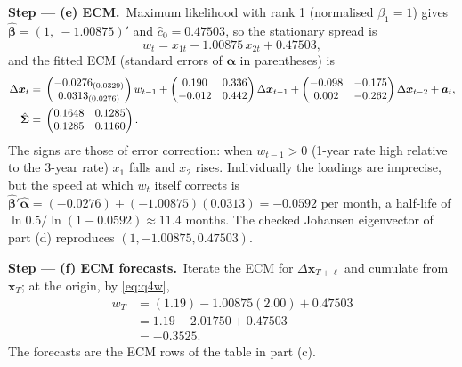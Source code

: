 \documentclass[11pt,a4paper]{article}
\newcommand{\passo}[2]{\par\smallskip\noindent\textbf{Step --- #1.}~#2}
\newcommand{\bx}{\bm{x}}\newcommand{\ba}{\bm{a}}\newcommand{\bb}{\bm{b}}\newcommand{\br}{\bm{r}}
\begin{document}
\begin{sol}
\passo{(e) ECM}{Maximum likelihood with rank 1 (normalised $\beta_1=1$) gives
$\hat{\bm\beta}=(1,\ -1.00875)'$ and $\hat c_0=0.47503$, so the stationary spread is
\begin{equation}
w_t=x_{1t}-1.00875\,x_{2t}+0.47503,\label{eq:q4w}
\end{equation}
and the fitted ECM (standard errors of $\bm\alpha$ in parentheses) is
\begin{align}
\Delta\bx_t={}&\begin{pmatrix}-0.0276_{(0.0329)}\\0.0313_{(0.0276)}\end{pmatrix}w_{t-1}
+\begin{pmatrix}0.190&0.336\\-0.012&0.442\end{pmatrix}\Delta\bx_{t-1}
+\begin{pmatrix}-0.098&-0.175\\0.002&-0.262\end{pmatrix}\Delta\bx_{t-2}+\ba_t,\nonumber\\
\hat{\bSigma}={}&\begin{pmatrix}0.1648&0.1285\\0.1285&0.1160\end{pmatrix}.\nonumber
\end{align}
The signs are those of error correction: when $w_{t-1}>0$ (1-year rate high relative to the 3-year rate)
$x_1$ falls and $x_2$ rises. Individually the loadings are imprecise, but the speed at which $w_t$
itself corrects is $\hat{\bm\beta}'\hat{\bm\alpha}=(-0.0276)+(-1.00875)(0.0313)=-0.0592$ per month, a
half-life of $\ln 0.5/\ln(1-0.0592)\approx11.4$ months. The checked Johansen eigenvector of part (d)
reproduces $(1,-1.00875,0.47503)$.}

\passo{(f) ECM forecasts}{Iterate the ECM for $\Delta\bx_{T+\ell}$ and cumulate from $\bx_T$; at the
origin, by \eqref{eq:q4w},
\begin{align}
w_T&=(1.19)-1.00875(2.00)+0.47503\nonumber\\
&=1.19-2.01750+0.47503\nonumber\\
&=-0.3525.\nonumber
\end{align}
The forecasts are the ECM rows of the table in part (c).}


\end{sol}
\end{document}
